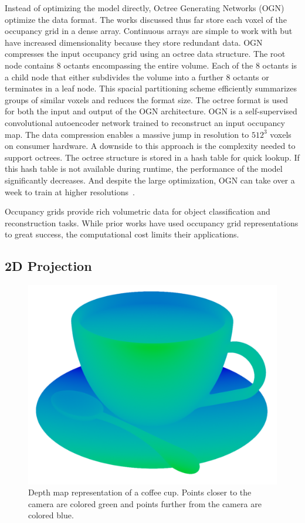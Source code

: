 Instead of optimizing the model directly, Octree Generating Networks (OGN)~\cite{Tatarchenko2017} optimize the data format. The works discussed thus far store each voxel of the occupancy grid in a dense array. Continuous arrays are simple to work with but have increased dimensionality because they store redundant data. OGN compresses the input occupancy grid using an octree data structure. The root node contains 8 octants encompassing the entire volume. Each of the 8 octants is a child node that either subdivides the volume into a further 8 octants or terminates in a leaf node. This spacial partitioning scheme efficiently summarizes groups of similar voxels and reduces the format size. The octree format is used for both the input and output of the OGN architecture. OGN is a self-supervised convolutional autoencoder network trained to reconstruct an input occupancy map. The data compression enables a massive jump in resolution to $512^3$ voxels on consumer hardware. A downside to this approach is the complexity needed to support octrees. The octree structure is stored in a hash table for quick lookup. If this hash table is not available during runtime, the performance of the model significantly decreases. And despite the large optimization, OGN can take over a week to train at higher resolutions~\cite{Tatarchenko2017}.

Occupancy grids provide rich volumetric data for object classification and reconstruction tasks. While prior works have used occupancy grid representations to great success, the computational cost limits their applications.

\newpage


\subsection{2D Projection}

\begin{figure}[ht]
	\centering
	\includegraphics[scale=0.2]{Images/Depth Map Cup}
	\caption{Depth map representation of a coffee cup. Points closer to the camera are colored green and points further from the camera are colored blue.}
	\label{fig:depth_map_cup}
\end{figure}

